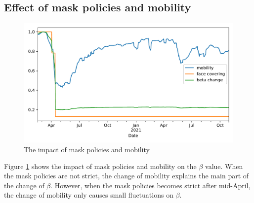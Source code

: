\subsection{Effect of mask policies and mobility}
\begin{figure}
	\centering
	\includegraphics[width=0.95\linewidth]{result/sg_calib1_change.pdf}
	\caption{The impact of mask policies and mobility}
	\label{change}
\end{figure}
Figure \ref{change} shows the impact of mask policies and mobility on the $\beta$ value. When the mask policies are not strict, the change of mobility explains the main part of the change of $\beta$. However, when the mask policies becomes strict after mid-April, the change of mobility only causes small fluctuations on $\beta$.
